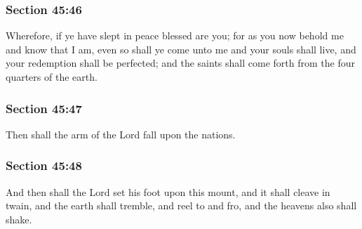 	\subsubsection{Section 45:46} %
		\label{DC45-46}

		Wherefore, if ye have slept in peace blessed are you; for as you now behold me and know that I am, even so shall ye come unto me and your souls shall live, and your redemption shall be perfected; and the saints shall come forth from the four quarters of the earth.


	\subsubsection{Section 45:47} %
		\label{DC45-47}

		Then shall the arm of the Lord fall upon the nations.


	\subsubsection{Section 45:48} %
		\label{DC45-48}

		And then shall the Lord set his foot upon this mount, and it shall cleave in twain, and the earth shall tremble, and reel to and fro, and the heavens also shall shake.


